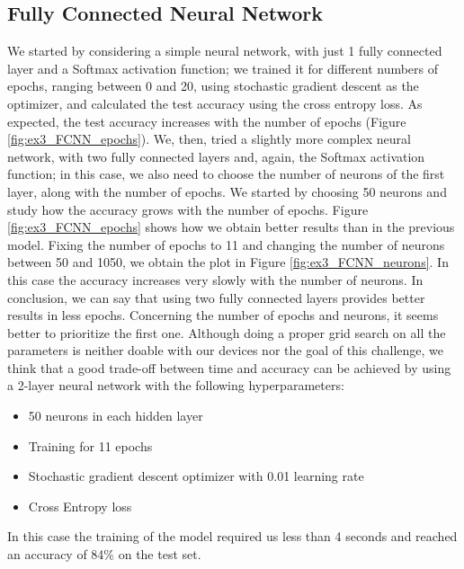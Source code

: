 \documentclass[12pt]{article}
\begin{document}
	\subsection*{Fully Connected Neural Network}
	We started by considering a simple neural network, with just 1 fully connected layer and a Softmax activation function; we trained it for different numbers of epochs, ranging between 0 and 20, using stochastic gradient descent as the optimizer, and calculated the test accuracy using the cross entropy loss. As expected, the test accuracy increases with the number of epochs (Figure \ref{fig:ex3_FCNN_epochs}).\newline
	We, then, tried a slightly more complex neural network, with two fully connected layers and, again, the Softmax activation function; in this case, we also need to choose the number of neurons of the first %
	layer, along with the number of epochs. We started by choosing 50 neurons and study how the accuracy grows with the number of epochs. Figure \ref{fig:ex3_FCNN_epochs} shows how we obtain better results than in the previous model.\newline
	Fixing the number of epochs to 11 and changing the number of neurons between 50 and 1050, we obtain the plot in Figure \ref{fig:ex3_FCNN_neurons}. In this case the accuracy increases very slowly with the number of neurons.\newline
	In conclusion, we can say that using two fully connected layers provides better results in less epochs. Concerning the number of epochs and neurons, it seems better to prioritize the first one.\newline
	Although doing a proper grid search on all the parameters is neither doable with our devices nor the goal of this challenge, we think that a good trade-off between time and accuracy can be achieved by using a 2-layer neural network with the following hyperparameters:
	\begin{itemize}
		\item 50 neurons in each hidden layer
		\item Training for 11 epochs
		\item Stochastic gradient descent optimizer with 0.01 learning rate
		\item Cross Entropy loss
	\end{itemize}
	In this case the training of the model required us less than 4 seconds and reached an accuracy of 84\% on the test set.
	
	
\end{document}
